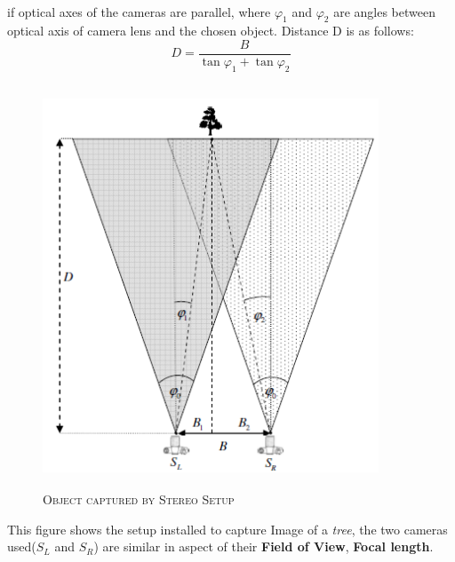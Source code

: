 \paragraph{} if optical axes of the cameras are parallel, where $\varphi_{1}$ and $\varphi_{2}$ are angles between optical axis of camera lens and the
chosen object.
Distance D is as follows:
\begin{equation}
D=\frac{B}{\tan\varphi_{1}+\tan\varphi_{2}}
\end{equation}
\begin{figure}[H]
	\centering
	\includegraphics[height= 12cm, width=10cm]{project/images/d.png}
	\caption{\textsc{Object captured by Stereo Setup}}
\end{figure}
This figure shows the setup installed to capture Image of a \emph{tree}, the two cameras used($S_{L}$ and $S_{R}$) are similar in aspect of their \textbf{Field of View}, \textbf{Focal length}.
\newpage

